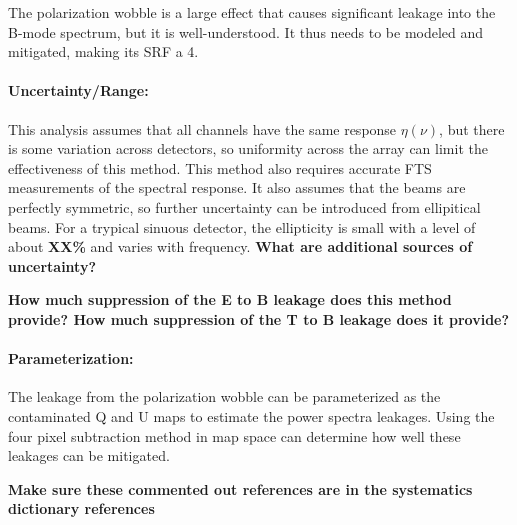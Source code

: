 The polarization wobble is a large effect that causes significant leakage into the B-mode spectrum, but it is well-understood. It thus needs to be modeled and mitigated, making its SRF a 4.

\paragraph{Uncertainty/Range:}
This analysis assumes that all channels have the same response $\eta(\nu)$, but there is some variation across detectors, so uniformity across the array can limit the effectiveness of this method. This method also requires accurate FTS measurements of the spectral response. It also assumes that the beams are perfectly symmetric, so further uncertainty can be introduced from ellipitical beams. For a trypical sinuous detector, the ellipticity is small with a level of about \textbf{XX\%} and varies with frequency. \textbf{What are additional sources of uncertainty?}

\textbf{How much suppression of the E to B leakage does this method provide? How much suppression of the T to B leakage does it provide?}

\paragraph{Parameterization:}
The leakage from the polarization wobble can be parameterized as the contaminated Q and U maps to estimate the power spectra leakages. Using the four pixel subtraction method in map space can determine how well these leakages can be mitigated.

\textbf{Make sure these commented out references are in the systematics dictionary references}
